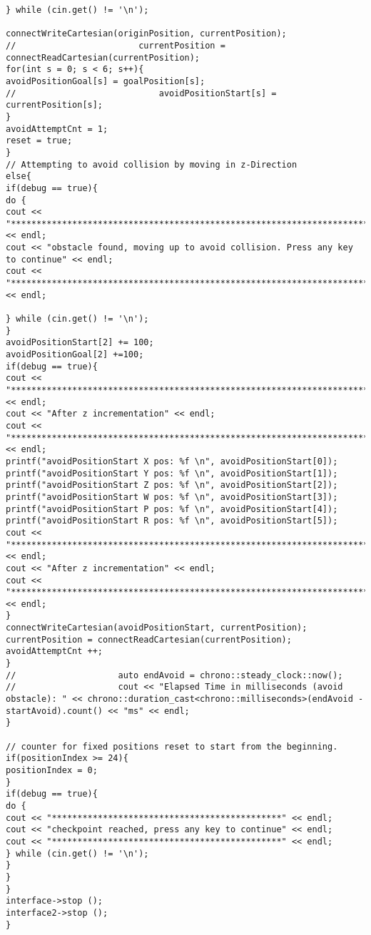 \begin{lstlisting}[frame = single, label={lst:cppread1}]
} while (cin.get() != '\n');

connectWriteCartesian(originPosition, currentPosition);
//                        currentPosition = connectReadCartesian(currentPosition);
for(int s = 0; s < 6; s++){
avoidPositionGoal[s] = goalPosition[s];
//                            avoidPositionStart[s] =  currentPosition[s];
}
avoidAttemptCnt = 1;
reset = true;
}
// Attempting to avoid collision by moving in z-Direction
else{
if(debug == true){
do {
cout << "***********************************************************************" << endl;
cout << "obstacle found, moving up to avoid collision. Press any key to continue" << endl;
cout << "***********************************************************************" << endl;

} while (cin.get() != '\n');
}
avoidPositionStart[2] += 100;
avoidPositionGoal[2] +=100;
if(debug == true){
cout << "***********************************************************************" << endl;
cout << "After z incrementation" << endl;
cout << "***********************************************************************" << endl;
printf("avoidPositionStart X pos: %f \n", avoidPositionStart[0]);
printf("avoidPositionStart Y pos: %f \n", avoidPositionStart[1]);
printf("avoidPositionStart Z pos: %f \n", avoidPositionStart[2]);
printf("avoidPositionStart W pos: %f \n", avoidPositionStart[3]);
printf("avoidPositionStart P pos: %f \n", avoidPositionStart[4]);
printf("avoidPositionStart R pos: %f \n", avoidPositionStart[5]);
cout << "***********************************************************************" << endl;
cout << "After z incrementation" << endl;
cout << "***********************************************************************" << endl;
}
connectWriteCartesian(avoidPositionStart, currentPosition);
currentPosition = connectReadCartesian(currentPosition);
avoidAttemptCnt ++;
}
//                    auto endAvoid = chrono::steady_clock::now();
//                    cout << "Elapsed Time in milliseconds (avoid obstacle): " << chrono::duration_cast<chrono::milliseconds>(endAvoid - startAvoid).count() << "ms" << endl;
}

// counter for fixed positions reset to start from the beginning.
if(positionIndex >= 24){
positionIndex = 0;
}
if(debug == true){
do {
cout << "*********************************************" << endl;
cout << "checkpoint reached, press any key to continue" << endl;
cout << "*********************************************" << endl;
} while (cin.get() != '\n');
}
}
}
interface->stop ();
interface2->stop ();
}


\end{lstlisting}
